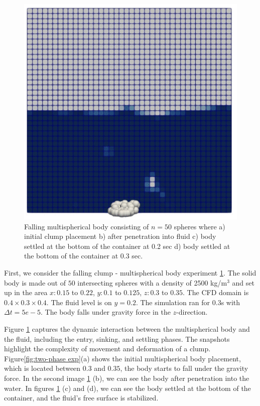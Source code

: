 \begin{figure}[H]
\begin{minipage}{.5\textwidth}
    \end{minipage}%
    \begin{minipage}{.5\textwidth}
        \centering
        \includegraphics[width=\linewidth]{GWU_Thesis_Sarmakeeva/Images/chap4/clump_4.png}
    \end{minipage}
    \caption{Falling multispherical body consisting of $n = 50$ spheres where a) initial clump placement b) after penetration into fluid c) body settled at the bottom of the container at 0.2 sec d) body settled at the bottom of the container at 0.3 sec.}
    \label{fig:two-phase_exp}
\end{figure}

First, we consider the falling clump - multispherical body experiment \ref{fig:two-phase_exp}. The solid body is made out of $50$ intersecting spheres with a density of 2500 kg/m$^3$ and set up in the area $x: 0.15 $ to $0.22$, $y: 0.1$ to $0.125$, $z: 0.3$ to $0.35$. The CFD domain is $0.4\times 0.3\times0.4$. The fluid level is on $y = 0.2$. The simulation ran for $0.3$s with $\Delta t = 5e-5$. The body falls under gravity force in the $z$-direction. 

Figure \ref{fig:two-phase_exp} captures the dynamic interaction between the multispherical body and the fluid, including the entry, sinking, and settling phases. The snapshots highlight the complexity of movement and deformation of a clump. Figure\ref{fig:two-phase exp}(a) shows the initial multispherical body placement, which is located between $0.3$ and $0.35$, the body starts to fall under the gravity force. In the second image \ref{fig:two-phase_exp} (b), we can see the body after penetration into the water. In figures \ref{fig:two-phase_exp} (c) and (d), we can see the body settled at the bottom of the container, and the fluid's free surface is stabilized.

